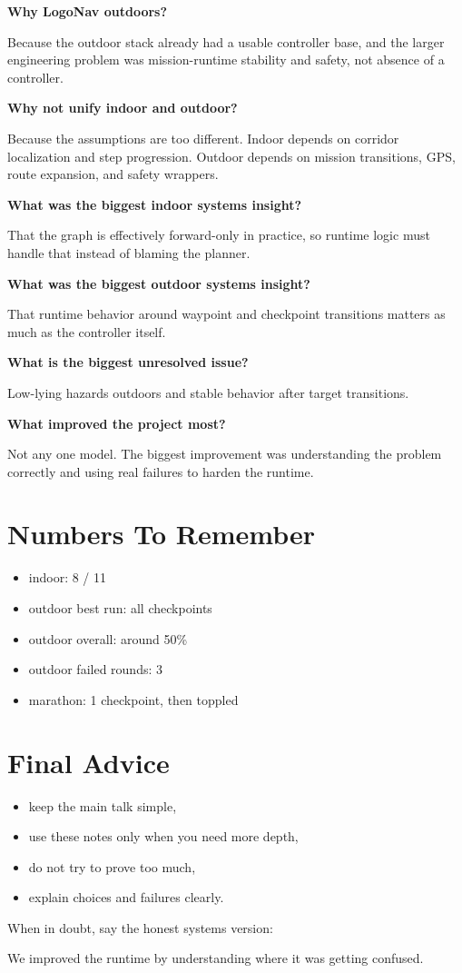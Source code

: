 \documentclass[11pt]{article}
\begin{document}
\textbf{Why LogoNav outdoors?}

Because the outdoor stack already had a usable controller base, and the larger engineering problem was mission-runtime stability and safety, not absence of a controller.

\textbf{Why not unify indoor and outdoor?}

Because the assumptions are too different. Indoor depends on corridor localization and step progression. Outdoor depends on mission transitions, GPS, route expansion, and safety wrappers.

\textbf{What was the biggest indoor systems insight?}

That the graph is effectively forward-only in practice, so runtime logic must handle that instead of blaming the planner.

\textbf{What was the biggest outdoor systems insight?}

That runtime behavior around waypoint and checkpoint transitions matters as much as the controller itself.

\textbf{What is the biggest unresolved issue?}

Low-lying hazards outdoors and stable behavior after target transitions.

\textbf{What improved the project most?}

Not any one model. The biggest improvement was understanding the problem correctly and using real failures to harden the runtime.

\section*{Numbers To Remember}
\begin{itemize}[leftmargin=*]
\item indoor: 8 / 11
\item outdoor best run: all checkpoints
\item outdoor overall: around 50\%
\item outdoor failed rounds: 3
\item marathon: 1 checkpoint, then toppled
\end{itemize}

\section*{Final Advice}
\begin{itemize}[leftmargin=*]
\item keep the main talk simple,
\item use these notes only when you need more depth,
\item do not try to prove too much,
\item explain choices and failures clearly.
\end{itemize}

When in doubt, say the honest systems version:

We improved the runtime by understanding where it was getting confused.
\end{document}
